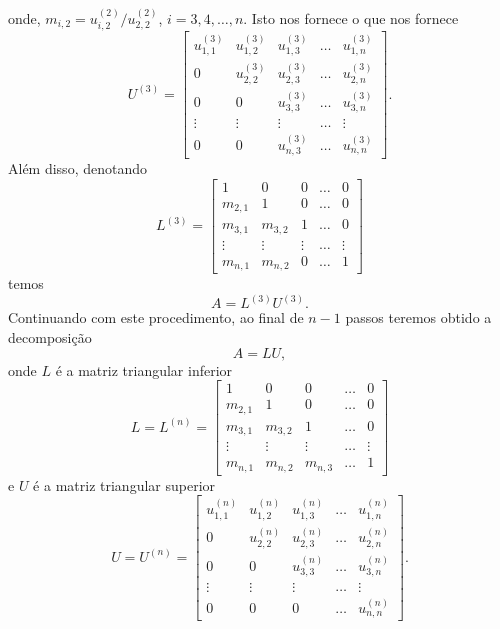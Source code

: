 onde, $m_{i,2} = u_{i,2}^{(2)}/u_{2,2}^{(2)}$, $i=3, 4, \ldots, n$. Isto nos fornece
o que nos fornece
\begin{equation}
  U^{(3)} = \begin{bmatrix}
    u_{1,1}^{(3)} & u_{1,2}^{(3)} & u_{1,3}^{(3)} & \ldots & u_{1,n}^{(3)} \\
    0 & u_{2,2}^{(3)} & u_{2,3}^{(3)} & \ldots & u_{2,n}^{(3)} \\
    0 & 0 & u_{3,3}^{(3)} & \ldots & u_{3,n}^{(3)} \\
    \vdots & \vdots & \vdots & \ldots & \vdots \\
    0 & 0 & u_{n,3}^{(3)} & \ldots & u_{n,n}^{(3)}
  \end{bmatrix}.
\end{equation}
Além disso, denotando
\begin{equation}
  L^{(3)} =
  \begin{bmatrix}
    1 & 0 & 0 & \ldots & 0\\
    m_{2,1} & 1 & 0 & \ldots & 0\\
    m_{3,1} & m_{3,2} & 1 & \ldots & 0\\
    \vdots & \vdots & \vdots & \ldots & \vdots\\
    m_{n,1} & m_{n,2} & 0 & \ldots & 1
  \end{bmatrix}
\end{equation}
temos
\begin{equation}
  A = L^{(3)}U^{(3)}.
\end{equation}
Continuando com este procedimento, ao final de $n-1$ passos teremos obtido a decomposição
\begin{equation}
  A = LU,
\end{equation}
onde $L$ é a matriz triangular inferior
\begin{equation}
  L = L^{(n)} =   \begin{bmatrix}
    1 & 0 & 0 & \ldots & 0\\
    m_{2,1} & 1 & 0 & \ldots & 0\\
    m_{3,1} & m_{3,2} & 1 & \ldots & 0\\
    \vdots & \vdots & \vdots & \ldots & \vdots\\
    m_{n,1} & m_{n,2} & m_{n,3} & \ldots & 1
  \end{bmatrix}
\end{equation}
e $U$ é a matriz triangular superior
\begin{equation}
  U = U^{(n)} = \begin{bmatrix}
    u_{1,1}^{(n)} & u_{1,2}^{(n)} & u_{1,3}^{(n)} & \ldots & u_{1,n}^{(n)} \\
    0 & u_{2,2}^{(n)} & u_{2,3}^{(n)} & \ldots & u_{2,n}^{(n)} \\
    0 & 0 & u_{3,3}^{(n)} & \ldots & u_{3,n}^{(n)} \\
    \vdots & \vdots & \vdots & \ldots & \vdots \\
    0 & 0 & 0 & \ldots & u_{n,n}^{(n)}
  \end{bmatrix}.
\end{equation}

